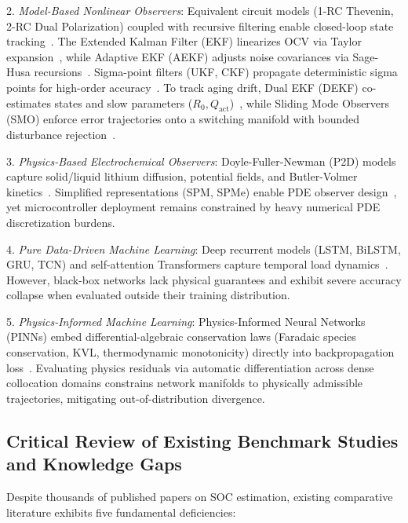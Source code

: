 \documentclass[balance,nocopyright,upint,varvw,hyphenate,barcolor=NavyBlue,nolists]{asmejour}
\begin{document}
2. \emph{Model-Based Nonlinear Observers}: Equivalent circuit models (1-RC Thevenin, 2-RC Dual Polarization) coupled with recursive filtering enable closed-loop state tracking~\cite{He2011ecm,Hu2012ecm}. The Extended Kalman Filter (EKF) linearizes OCV via Taylor expansion~\cite{Plett2004part3,Santhanagopalan2006jes}, while Adaptive EKF (AEKF) adjusts noise covariances via Sage-Husa recursions~\cite{Han2019aekf,Wang2021tcn}. Sigma-point filters (UKF, CKF) propagate deterministic sigma points for high-order accuracy~\cite{Plett2006ukf,He2013ukf,Peng2021ackf}. To track aging drift, Dual EKF (DEKF) co-estimates states and slow parameters ($R_0, Q_{\text{act}}$)~\cite{Charkhgard2010dekf,Yang2024degradation}, while Sliding Mode Observers (SMO) enforce error trajectories onto a switching manifold with bounded disturbance rejection~\cite{Kim2011,Chen2016smo,Feng2019smo}.

3. \emph{Physics-Based Electrochemical Observers}: Doyle-Fuller-Newman (P2D) models capture solid/liquid lithium diffusion, potential fields, and Butler-Volmer kinetics~\cite{Doyle1993,Torchio2016pybam,Northrop2014p2d}. Simplified representations (SPM, SPMe) enable PDE observer design~\cite{DiDomenico2010spm,Moura2017pde,Marquis2019spme}, yet microcontroller deployment remains constrained by heavy numerical PDE discretization burdens.

4. \emph{Pure Data-Driven Machine Learning}: Deep recurrent models (LSTM, BiLSTM, GRU, TCN) and self-attention Transformers capture temporal load dynamics~\cite{Hansen2005svr,Chemali2018dnn,Liu2020gpr,Song2019bilstm,Jiao2020attn,Wang2021tcn,Vaswani2017attention,Shen2023transformer}. However, black-box networks lack physical guarantees and exhibit severe accuracy collapse when evaluated outside their training distribution.

5. \emph{Physics-Informed Machine Learning}: Physics-Informed Neural Networks (PINNs) embed differential-algebraic conservation laws (Faradaic species conservation, KVL, thermodynamic monotonicity) directly into backpropagation loss~\cite{Raissi2019pinn,Brancato2026,Li2023nature}. Evaluating physics residuals via automatic differentiation across dense collocation domains constrains network manifolds to physically admissible trajectories, mitigating out-of-distribution divergence.

\subsection{Critical Review of Existing Benchmark Studies and Knowledge Gaps}
Despite thousands of published papers on SOC estimation, existing comparative literature exhibits five fundamental deficiencies:
\end{document}
